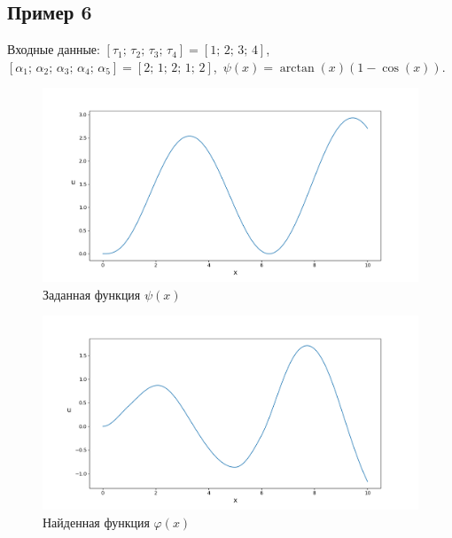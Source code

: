 \documentclass{article}
\theoremstyle{definition}
\begin{document}
\subsection{Пример 6}
Входные данные: 
$[\tau_1;\, \tau_2;\, \tau_3;\, \tau_4] = [1;\, 2;\, 3;\, 4]$, \\[1mm]
$[\alpha_1;\, \alpha_2;\, \alpha_3;\, \alpha_4;\, \alpha_5] = [2;\, 1;\, 2;\, 1;\, 2]$, 
$\,\psi(x) = \arctan(x)(1 - \cos(x))$.
\begin{figure}[H]
	\centering
	\includegraphics[trim={2.475cm, 0, 0, 1.5cm}, clip, scale=0.624]{56_psi.png}
	\caption{Заданная функция $\psi(x)$}
	\label{fig:image13}
\end{figure}

\begin{figure}[H]
	\centering
	\includegraphics[trim={2.15cm, 0, 0, 1.5cm}, clip, scale=0.618]{5_u0.png}
	\caption{Найденная функция $\varphi(x)$}
	\label{fig:image14}
\end{figure}

\newpage
\end{document}
